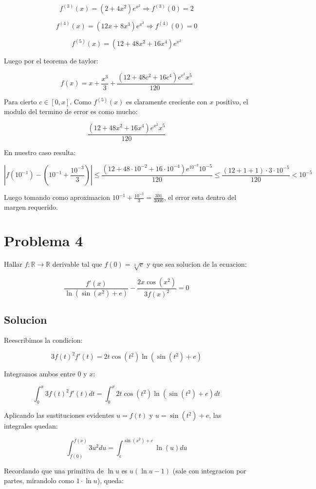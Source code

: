 \documentclass{article}
\begin{document}
$$f^{(3)}(x) = (2 + 4x^2)e^{x^2} \Rightarrow f^{(3)}(0) = 2$$

$$f^{(4)}(x) = (12x + 8x^3)e^{x^2} \Rightarrow f^{(4)}(0) = 0$$

$$f^{(5)}(x) = (12 + 48x^2 + 16x^4)e^{x^2}$$

Luego por el teorema de taylor:

$$f(x) = x + \frac{x^3}{3} + \frac{(12 + 48c^2 + 16c^4)e^{c^2}x^5}{120}$$

Para cierto $c \in [0,x]$. Como $f^{(5)}(x)$ es claramente creciente con $x$ positivo, el modulo del termino de error es como mucho:

$$\frac{(12 + 48x^2 + 16x^4)e^{x^2}x^5}{120}$$

En nuestro caso resulta:

$$\left |f \left (10^{-1} \right ) - \left (10^{-1} + \frac{10^{-3}}{3} \right ) \right | \leq
     \frac{(12 + 48 \cdot 10^{-2} + 16 \cdot 10^{-4})e^{10^{-2}}10^{-5}}{120} \leq
     \frac{(12 + 1 + 1) \cdot 3\cdot 10^{-5}}{120} < 10^{-5}$$

Luego tomando como aproximacion $10^{-1} + \frac{10^{-3}}{3} = \frac{301}{3000}$, el error esta dentro del margen requerido.

\section{Problema 4}

Hallar $f : \mathbb{R} \rightarrow \mathbb{R}$ derivable tal que $f(0) = \sqrt[3]{e}$ y que sea solucion de la ecuacion:

$$\frac{f'(x)}{\ln(\sin(x^2) + e)} - \frac{2x\cos(x^2)}{3f(x)^2} = 0$$

\subsection{Solucion}

Reescribimos la condicion:

$$3f(t)^2f'(t) = 2t\cos(t^2) \ln(\sin(t^2) + e)$$

Integramos ambos entre $0$ y $x$:

$$\int_0^x{3f(t)^2f'(t)dt} = \int_0^x{2t\cos(t^2) \ln(\sin(t^2) + e)dt}$$

Aplicando las sustituciones evidentes $u = f(t)$ y $u = \sin(t^2) + e$, las integrales quedan:

$$\int_{f(0)}^{f(x)}{3u^2du} = \int_e^{\sin(x^2) + e}{\ln(u)du}$$

Recordando que una primitiva de $\ln u$ es $u(\ln u - 1)$ (sale con integracion por partes, mirandolo como $1 \cdot \ln u$), queda:
\end{document}
